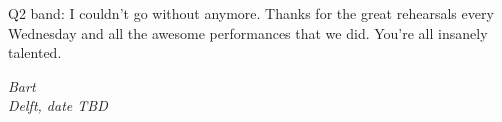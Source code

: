 Q2 band: I couldn't go without anymore. Thanks for the great rehearsals every Wednesday and all the awesome performances that we did. You're all insanely talented.






















\begin{flushright}
{\itshape
Bart \\
Delft, date TBD
}
\end{flushright}
